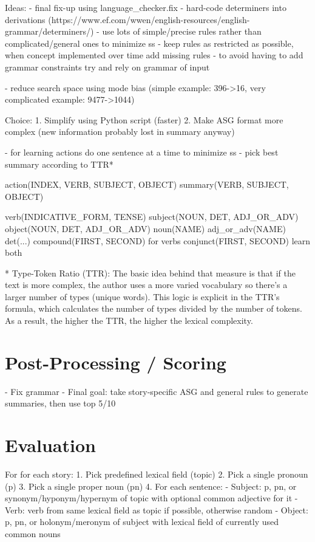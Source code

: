 \documentclass[12pt,twoside]{report}
\theoremstyle{definition}
\begin{document}
Ideas:
- final fix-up using language\_checker.fix
- hard-code determiners into derivations (https://www.ef.com/wwen/english-resources/english-grammar/determiners/)
- use lots of simple/precise rules rather than complicated/general ones to minimize ss
- keep rules as restricted as possible, when concept implemented over time add missing rules
- to avoid having to add grammar constraints try and rely on grammar of input

- reduce search space using mode bias (simple example: 396->16, very complicated example: 9477->1044)

Choice:
1. Simplify using Python script (faster)
2. Make ASG format more complex (new information probably lost in summary anyway)

- for learning actions do one sentence at a time to minimize ss
- pick best summary according to TTR*

action(INDEX, VERB, SUBJECT, OBJECT)
summary(VERB, SUBJECT, OBJECT)

verb(INDICATIVE\_FORM, TENSE)
subject(NOUN, DET, ADJ\_OR\_ADV)
object(NOUN, DET, ADJ\_OR\_ADV)
noun(NAME)
adj\_or\_adv(NAME)
det(...)
compound(FIRST, SECOND)  for verbs
conjunct(FIRST, SECOND)  learn both

* Type-Token Ratio (TTR): The basic idea behind that measure is that if the text is more complex, the author uses a more varied vocabulary so there’s a larger number of types (unique words). This logic is explicit in the TTR’s formula, which calculates the number of types divided by the number of tokens. As a result, the higher the TTR, the higher the lexical complexity.

\chapter{Post-Processing / Scoring}


- Fix grammar
- Final goal: take story-specific ASG and general rules to generate summaries, then use top 5/10

\chapter{Evaluation}


For for each story:
1. Pick predefined lexical field (topic)
2. Pick a single pronoun (p)
3. Pick a single proper noun (pn)
4. For each sentence:
    - Subject: p, pn, or synonym/hyponym/hypernym of topic with optional common adjective for it
    - Verb: verb from same lexical field as topic if possible, otherwise random
    - Object: p, pn, or holonym/meronym of subject with lexical field of currently used common nouns
    
\end{document}
